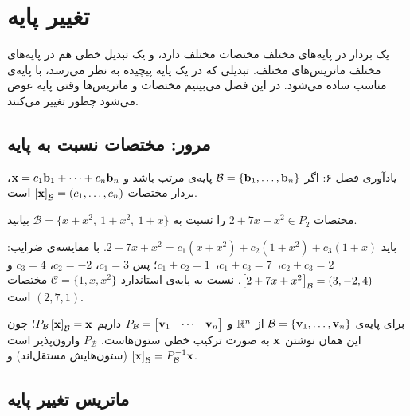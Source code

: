 \chapter{تغییر پایه}
\label{ch:change-of-basis}

یک بردار در پایه‌های  مختلف مختصات مختلف دارد، و یک تبدیل خطی  هم در پایه‌های مختلف ماتریس‌های مختلف. تبدیلی که در یک پایه پیچیده به نظر می‌رسد، با پایه‌ی مناسب ساده می‌شود. در این فصل می‌بینیم مختصات و ماتریس‌ها وقتی پایه عوض می‌شود چطور تغییر می‌کنند.

\section{مرور: مختصات نسبت به پایه}

یادآوری فصل ۶: اگر $\mathcal{B}=\{\mathbf{b}_1,\dots,\mathbf{b}_n\}$ پایه‌ی مرتب  باشد و $\mathbf{x}=c_1\mathbf{b}_1+\dots+c_n\mathbf{b}_n$، بردار مختصات  $\left[\mathbf{x}\right]_{\mathcal{B}}=(c_1,\dots,c_n)$ است.

\begin{example}
مختصات $2+7x+x^2\in P_2$ را نسبت به $\mathcal{B}=\{x+x^2,\ 1+x^2,\ 1+x\}$ بیابید.
\end{example}
\begin{solution}
باید $2+7x+x^2=c_1(x+x^2)+c_2(1+x^2)+c_3(1+x)$. با مقایسه‌ی ضرایب:
$c_2+c_3=2$،\ $c_1+c_3=7$،\ $c_1+c_2=1$؛ پس $c_1=3$، $c_2=-2$، $c_3=4$ و
$\left[2+7x+x^2\right]_{\mathcal{B}}=(3,-2,4)$. نسبت به پایه‌ی استاندارد  $\mathcal{C}=\{1,x,x^2\}$ مختصات $(2,7,1)$ است.
\end{solution}

برای پایه‌ی $\mathcal{B}=\{\mathbf{v}_1,\dots,\mathbf{v}_n\}$ از $\mathbb{R}^n$ و $P_{\mathcal{B}}=\begin{bmatrix}\mathbf{v}_1&\cdots&\mathbf{v}_n\end{bmatrix}$ داریم $P_{\mathcal{B}}\left[\mathbf{x}\right]_{\mathcal{B}}=\mathbf{x}$؛ چون این همان نوشتن $\mathbf{x}$ به صورت ترکیب خطی  ستون‌هاست. $P_{\mathcal{B}}$ وارون‌پذیر  است (ستون‌هایش مستقل‌اند) و $\left[\mathbf{x}\right]_{\mathcal{B}}=P_{\mathcal{B}}^{-1}\mathbf{x}$.

\section{ماتریس تغییر پایه}

